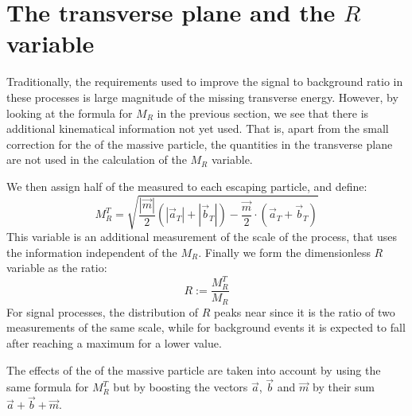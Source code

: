 \section{The transverse plane and the $R$ variable}\label{sec:r}
Traditionally, the requirements used to improve the signal to background
ratio in these processes is large magnitude of the missing transverse
energy.
However, by looking at the formula for $M_R$ in the previous section, we see
that there is additional kinematical information not yet used. That is,
apart from the small correction for the \pt of the massive particle, the
quantities in the transverse plane are not used in the calculation of the
$M_R$ variable.

We then assign half of the measured \met to each escaping particle,
and define:
\begin{equation*}
    M_{R}^T = \sqrt{\dfrac{|\vec{m}|}{2}(|\vec{a}_T| + |\vec{b}_T|) -
    \dfrac{\vec m}{2}\cdot (\vec{a}_T + \vec{b}_T)}
\end{equation*}
This variable is an additional measurement of the scale of the process, that
uses the information independent of the $M_R$. Finally we form the
dimensionless $R$ variable as the ratio:
\begin{equation*}
    R\mathop:= \dfrac{M_R^T}{M_R}
\end{equation*}
For signal processes, the distribution of $R$ peaks near 
since it is the ratio of two measurements of the same scale, while for
background events it is expected to fall after reaching a maximum for a
lower value.

The effects of the \pt of the massive particle are taken into account by
using the same formula for $M_R^T$ but by boosting the vectors $\vec a$,
$\vec b$ and $\vec m$ by their sum $\vec a + \vec b + \vec m$.

